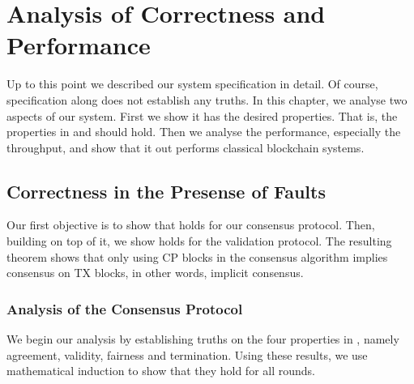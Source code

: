 \chapter{Analysis of Correctness and Performance}
\label{ch:analysis}

Up to this point we described our system specification in detail.
Of course, specification along does not establish any truths.
In this chapter, we analyse two aspects of our system.
First we show it has the desired properties.
That is, the properties in  and  should hold.
Then we analyse the performance, especially the throughput,
and show that it out performs classical blockchain systems.

\section{Correctness in the Presense of Faults}
Our first objective is to show that  holds for our consensus protocol.
Then, building on top of it, we show  holds for the validation protocol.
The resulting theorem shows that only using CP blocks in the consensus algorithm implies consensus on TX blocks,
in other words, implicit consensus.


\subsection{Analysis of the Consensus Protocol}

We begin our analysis by establishing truths on the four properties in ,
namely agreement, validity, fairness and termination.
Using these results, we use mathematical induction to show that they hold for all rounds.

